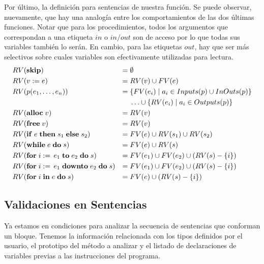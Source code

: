 \documentclass{article}
\begin{document}
Por último, la definición para sentencias de nuestra función.
Se puede observar, nuevamente, que hay una analogía entre los comportamientos de las dos últimas funciones.
Notar que para los procedimientos, todos los argumentos que correspondan a una etiqueta $in$ o $in/out$ son de acceso por lo que todas sus variables también lo serán.
En cambio, para las etiquetas $out$, hay que ser más selectivos sobre cuales variables son efectivamente utilizadas para lectura.
\begin{align*}
&RV(\mathbf{skip})
&=&\;
\emptyset
\\
&RV(v := e)
&=&\;
RV(v) \cup FV(e)
\\
&RV(p(e_1, \ldots, e_n))
&=&\;
\{ FV(e_i) \mid a_i \in Inputs(p) \cup InOuts(p) \}
\\
&&&
\;\ldots\cup
\{ RV(e_i) \mid a_i \in Outputs(p) \}
\\
&RV(\mathbf{alloc} \; v)
&=&\;
RV(v)
\\
&RV(\mathbf{free} \; v)
&=&\;
RV(v)
\\
&RV(\mathbf{if} \; e \; \mathbf{then} \; s_1 \; \mathbf{else} \; s_2)
&=&\;
FV(e) \cup RV(s_1) \cup RV(s_2)
\\
&RV(\mathbf{while} \; e \; \mathbf{do} \; s)
&=&\;
FV(e) \cup RV(s)
\\
&RV(\mathbf{for} \; i := \, e_1 \; \mathbf{to} \; e_2 \; \mathbf{do} \; s)
&=&\;
FV(e_1) \cup FV(e_2) \cup (RV(s) - \{ i \})
\\
&RV(\mathbf{for} \; i := \, e_1 \; \mathbf{downto} \; e_2 \; \mathbf{do} \; s)
&=&\;
FV(e_1) \cup FV(e_2) \cup (RV(s) - \{ i \})
\\
&RV(\mathbf{for} \; i \; \mathbf{in} \; e \; \mathbf{do} \; s)
&=&\;
FV(e) \cup (RV(s) - \{ i \})
\end{align*}



\subsection{Validaciones en Sentencias}

Ya estamos en condiciones para analizar la secuencia de sentencias que conforman un bloque.
Tenemos la información relacionada con los tipos definidos por el usuario, el prototipo del método a analizar y el listado de declaraciones de variables previas a las instrucciones del programa.
\end{document}
